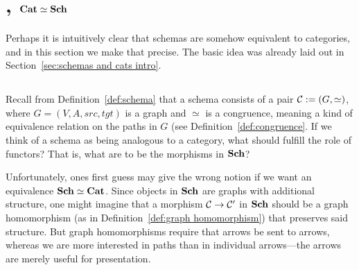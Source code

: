 \documentclass[CT4S-EN-RU]{subfiles}
\begin{document}
\section{, \texorpdfstring{${\mathbf{Cat}}\simeq{\mathbf{Sch}}$}{Cat = Sch}}\label{sec:cat equiv sch}

\begin{blockENG}
Perhaps it is intuitively clear that schemas are somehow equivalent to categories, and in this section we make that precise. The basic idea was already laid out in Section~\ref{sec:schemas and cats intro}.
\end{blockENG}

\begin{blockRUS}
\end{blockRUS}


\subsection{}\label{sec:sch as category}

\begin{blockENG}
Recall from Definition~\ref{def:schema} that a schema consists of a pair $\mathcal{C}:=(G,\simeq)$, where $G=(V,A,src,tgt)$ is a graph and $\simeq$ is a congruence, meaning a kind of equivalence relation on the paths in $G$ (see Definition~\ref{def:congruence}. If we think of a schema as being analogous to a category, what should fulfill the role of functors? That is, what are to be the morphisms in ${\mathbf{Sch}}$?
\end{blockENG}

\begin{blockRUS}
\end{blockRUS}

\begin{blockENG}
Unfortunately, ones first guess may give the wrong notion if we want an equivalence ${\mathbf{Sch}}\simeq{\mathbf{Cat}}$. Since objects in ${\mathbf{Sch}}$ are graphs with additional structure, one might imagine that a morphism $\mathcal{C}\rightarrow\mathcal{C}'$ in ${\mathbf{Sch}}$ should be a graph homomorphism (as in Definition~\ref{def:graph homomorphism}) that preserves said structure. But graph homomorphisms require that arrows be sent to arrows, whereas we are more interested in paths than in individual arrows—the arrows are merely useful for presentation. 
\end{blockENG}
\end{document}
